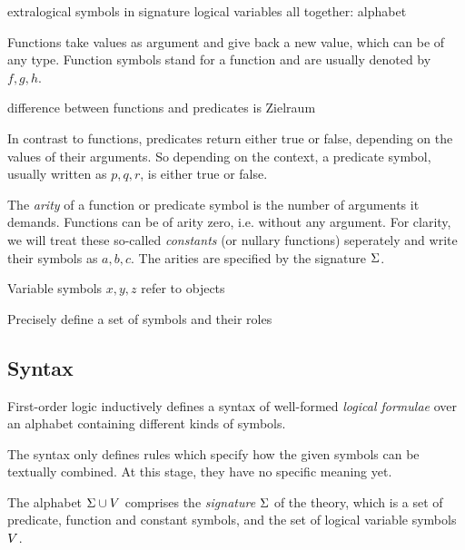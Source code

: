         extralogical symbols in signature
        logical variables
        all together: alphabet

        Functions take values as argument and give back a new value, which can be of any type. Function symbols stand for a function and are usually denoted by $f,g,h$.

        difference between functions and predicates is Zielraum

        In contrast to functions, predicates return either true or false, depending on the values of their arguments.
        So depending on the context, a predicate symbol, usually written as $p,q,r$, is either true or false.

        The \emph{arity} of a function or predicate symbol is the number of arguments it demands.
        Functions can be of arity zero, i.e. without any argument.
        For clarity, we will treat these so-called \emph{constants} (or nullary functions) seperately and write their symbols as $a,b,c$.
        The arities are specified by the signature $\Sigma$.

        Variable symbols $x,y,z$ refer to objects

        Precisely define a set of symbols and their roles

        \subsection{Syntax}
            \label{sec:FOL-syntax}

            First-order logic inductively defines a syntax of well-formed \emph{logical formulae} over an alphabet containing different kinds of symbols.

            The syntax only defines rules which specify how the given symbols can be textually combined. At this stage, they have no specific meaning yet.

            The alphabet $\Sigma\cup V$ comprises the \emph{signature} $\Sigma$ of the theory, which is a set of predicate, function and constant symbols, and the set of logical variable symbols $V$.

